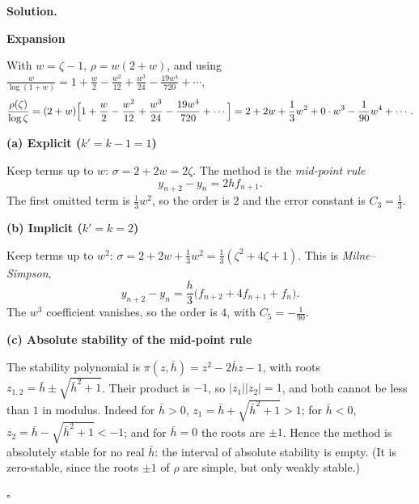 \documentclass[11pt,a4paper]{article}
\newenvironment{solution}
  {\par\noindent\textbf{Solution.}\par\nobreak}
  {\par\nobreak\noindent\hfill\(\square\)\par}
\newcommand{\step}[1]{\par\addvspace{0.5em}\noindent\textbf{#1}\par\nobreak}
\newcommand{\hb}{\bar h}
\begin{document}
\begin{solution}
\step{Expansion}
With \(w=\zeta-1\), \(\rho=w(2+w)\), and using
\(\frac{w}{\log(1+w)}=1+\frac w2-\frac{w^2}{12}+\frac{w^3}{24}-\frac{19w^4}{720}+\cdots\),
\[
  \frac{\rho(\zeta)}{\log\zeta}
  =(2+w)\Bigl[1+\frac w2-\frac{w^2}{12}+\frac{w^3}{24}-\frac{19w^4}{720}+\cdots\Bigr]
  =2+2w+\frac13w^2+0\cdot w^3-\frac1{90}w^4+\cdots .
\]

\step{(a) Explicit (\(k'=k-1=1\))}
Keep terms up to \(w\): \(\sigma=2+2w=2\zeta\).  The method is the
\emph{mid-point rule}
\[
  y_{n+2}-y_n=2hf_{n+1}.
\]
The first omitted term is \(\frac13w^2\), so the order is \(2\) and the
error constant is \(C_3=\frac13\).

\step{(b) Implicit (\(k'=k=2\))}
Keep terms up to \(w^2\):
\(\sigma=2+2w+\frac13w^2=\frac13(\zeta^2+4\zeta+1)\).  This is
\emph{Milne--Simpson},
\[
  y_{n+2}-y_n=\frac h3\bigl(f_{n+2}+4f_{n+1}+f_n\bigr).
\]
The \(w^3\) coefficient vanishes, so the order is \(4\), with
\(C_5=-\frac1{90}\).

\step{(c) Absolute stability of the mid-point rule}
The stability polynomial is \(\pi(z,\hb)=z^2-2\hb z-1\), with roots
\(z_{1,2}=\hb\pm\sqrt{\hb^2+1}\).  Their product is \(-1\), so
\(|z_1||z_2|=1\), and both cannot be less than \(1\) in modulus.  Indeed
for \(\hb>0\), \(z_1=\hb+\sqrt{\hb^2+1}>1\); for \(\hb<0\),
\(z_2=\hb-\sqrt{\hb^2+1}<-1\); and for \(\hb=0\) the roots are \(\pm1\).
Hence the method is absolutely stable for no real \(\hb\): the interval
of absolute stability is empty.  (It is zero-stable, since the roots
\(\pm1\) of \(\rho\) are simple, but only weakly stable.)
\end{solution}
\end{document}
